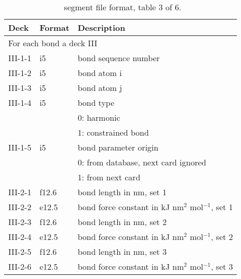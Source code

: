 \begin{table}[htbp]
\begin{center}
\begin{tabular*}{150mm}{p{15mm}p{12mm}l}
\hline\hline
Deck & Format & Description \\ \hline
\multicolumn{3}{l}{For each bond a deck III} \\
III-1-1 & i5     & bond sequence number \\
III-1-2 & i5     & bond atom i \\
III-1-3 & i5     & bond atom j \\
III-1-4 & i5     & bond type \\
        &        & 0: harmonic\\
        &        & 1: constrained bond\\
III-1-5 & i5     & bond parameter origin\\
        &        & 0: from database, next card ignored \\
        &        & 1: from next card\\
III-2-1 & f12.6  & bond length in nm, set 1\\
III-2-2 & e12.5  & bond force constant in kJ nm$^2$ mol$^{-1}$, set 1 \\
III-2-3 & f12.6  & bond length in nm, set 2\\
III-2-4 & e12.5  & bond force constant in kJ nm$^2$ mol$^{-1}$, set 2 \\
III-2-5 & f12.6  & bond length in nm, set 3\\
III-2-6 & e12.5  & bond force constant in kJ nm$^2$ mol$^{-1}$, set 3 \\
\hline
\end{tabular*}
\caption{\nwargos\ segment file format, table 3 of 6.\label{tbl:nwaseg3}}
\end{center}
\end{table}

